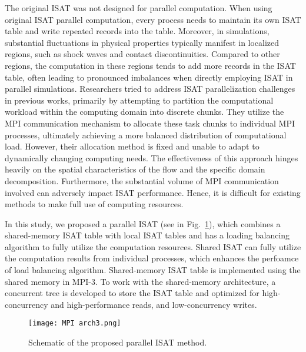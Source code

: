 The original ISAT was not designed for parallel computation. When using original ISAT parallel computation, every process needs to maintain its own ISAT table and write repeated records into the table. Moreover, in simulations, substantial fluctuations in physical properties typically manifest in localized regions, such as shock waves and contact discontinuities. Compared to other regions, the computation in these regions tends to add more records in the ISAT table, often leading to pronounced imbalances when directly employing ISAT in parallel simulations. Researchers tried to address ISAT parallelization challenges in previous works\cite{lu2009computationally,wu2018parallel}, primarily by attempting to partition the computational workload within the computing domain into discrete chunks. They utilize the MPI communication mechanism to allocate these task chunks to individual MPI processes, ultimately achieving a more balanced distribution of computational load. However, their allocation method is fixed and unable to adapt to dynamically changing computing needs. The effectiveness of this approach hinges heavily on the spatial characteristics of the flow and the specific domain decomposition. Furthermore, the substantial volume of MPI communication involved can adversely impact ISAT performance.
Hence, it is difficult for existing methods to make full use of computing resources.


In this study, we proposed a parallel ISAT (see in Fig.~\ref{MPI_arch2}), which combines a shared-memory ISAT table with local ISAT tables and has a loading balancing algorithm to fully utilize the computation resources. Shared ISAT can fully utilize the computation results from individual processes, which enhances the perfoamce of load balancing algorithm. Shared-memory ISAT table is implemented using the shared memory in MPI-3. To work with the shared-memory architecture, a concurrent tree is developed to store the ISAT table and optimized for high-concurrency and high-performance reads, and low-concurrency writes.


\begin{figure}[htbp]
	\centering
	\texttt{[image: MPI arch3.png]}
	\caption{Schematic of the proposed parallel ISAT method.}
	\label{MPI_arch2}
\end{figure}


